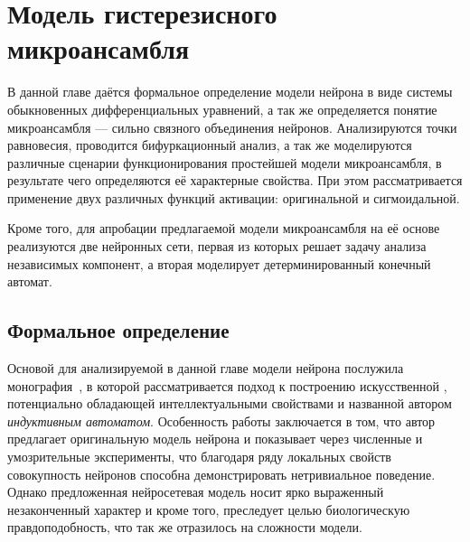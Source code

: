 \chapter{Модель гистерезисного микроансамбля} \label{chapter:neuron}

В данной главе даётся формальное определение модели нейрона в виде системы обыкновенных дифференциальных уравнений, а так же определяется понятие микроансамбля --- сильно связного объединения нейронов. Анализируются точки равновесия, проводится бифуркационный анализ, а так же моделируются различные сценарии функционирования простейшей модели микроансамбля, в результате чего определяются её характерные свойства. При этом рассматривается применение двух различных функций активации: оригинальной и сигмоидальной. 

Кроме того, для апробации предлагаемой модели микроансамбля на её основе реализуются две нейронных сети, первая из которых решает задачу анализа независимых компонент, а вторая моделирует детерминированный конечный автомат. 


\section{Формальное определение} \label{section:neuron_model}

Основой для анализируемой в данной главе модели нейрона послужила монография~\cite{EmelyanovYaroslavsky1990}, в которой рассматривается подход к построению искусственной , потенциально обладающей интеллектуальными свойствами и названной автором \textit{индуктивным автоматом}. Особенность работы заключается в том, что автор предлагает оригинальную модель нейрона и показывает через численные и умозрительные эксперименты, что благодаря ряду локальных свойств совокупность нейронов способна демонстрировать нетривиальное поведение. Однако предложенная нейросетевая модель носит ярко выраженный незаконченный характер и кроме того, преследует целью биологическую правдоподобность, что так же отразилось на сложности модели.


